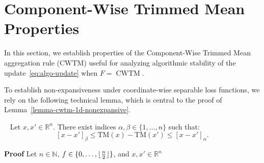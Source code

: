 \documentclass[twoside,11pt]{article}
\newcommand\mb{\mathbb}
\DeclarePairedDelimiter\floor{\lfloor}{\rfloor}
\begin{document}
\section{Component-Wise Trimmed Mean Properties}\label{tm}

In this section, we establish properties of the Component-Wise Trimmed Mean aggregation rule ($\mathrm{CWTM}$) useful for analyzing algorithmic stability of the update~\eqref{eq:algo-update} when $F=\operatorname{CWTM}$.

To establish non-expansiveness under coordinate-wise separable loss functions, we rely on the following technical lemma, which is central to the proof of Lemma~\ref{lemma-cwtm-1d-nonexpansive}.
\begin{lemma}~\label{trimmed-mean-lowerbound}    
    Let $x, x' \in \mb{R}^n$. There exist indices $\alpha, \beta \in \{1, \ldots, n\}$ such that: 
    \[
        {\left[ x - x' \right]}_\beta \leq \mathrm{TM}(x) - \mathrm{TM}(x') \leq {\left[ x - x' \right]}_\alpha.
    \]
\end{lemma}
\textbf{Proof}\;
    Let $n \in \mb{N}$, $f \in \{0, \ldots, \floor{\frac{n}{2}}\}$, and $x, x' \in \mb{R}^n$
\end{document}
